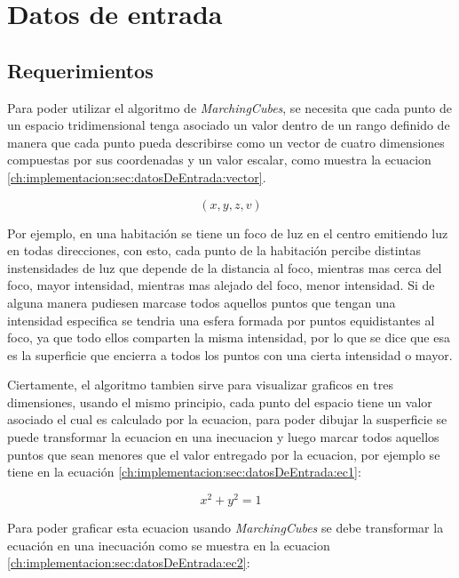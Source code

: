 \section{Datos de entrada}
\label{ch:implementacion:sec:datosDeEntrada}

\subsection{Requerimientos}
\label{ch:implementacion:sec:datosDeEntrada:subsec:requerimientos}

Para poder utilizar el algoritmo de \emph{MarchingCubes}, se necesita que cada punto de un espacio tridimensional tenga asociado un valor dentro de un rango definido de manera que cada punto pueda describirse como un vector de cuatro dimensiones compuestas por sus coordenadas y un valor escalar, como muestra la ecuacion \ref{ch:implementacion:sec:datosDeEntrada:vector}.

\begin{equation}
\label{ch:implementacion:sec:datosDeEntrada:vector}
	(x,y,z,v)
\end{equation}

Por ejemplo, en una habitación se tiene un foco de luz en el centro emitiendo luz en todas direcciones, con esto, cada punto de la habitación percibe distintas instensidades de luz que depende de la distancia al foco, mientras mas cerca del foco, mayor intensidad, mientras mas alejado del foco, menor intensidad. Si de alguna manera pudiesen marcase todos aquellos puntos que tengan una intensidad especifica se tendria una esfera formada por puntos equidistantes al foco, ya que todo ellos comparten la misma intensidad, por lo que se dice que esa es la superficie que encierra a todos los puntos con una cierta intensidad o mayor.

Ciertamente, el algoritmo tambien sirve para visualizar graficos en tres dimensiones, usando el mismo principio, cada punto del espacio tiene un valor asociado el cual es calculado por la ecuacion, para poder dibujar la susperficie se puede transformar la ecuacion en una inecuacion y luego marcar todos aquellos puntos que sean menores que el valor entregado por la ecuacion, por ejemplo se tiene en la ecuación \ref{ch:implementacion:sec:datosDeEntrada:ec1}:

\begin{equation}
\label{ch:implementacion:sec:datosDeEntrada:ec1}
	x^{2} + y^{2} = 1
\end{equation}

Para poder graficar esta ecuacion usando \emph{MarchingCubes} se debe transformar la ecuación en una inecuación como se muestra en la ecuacion \ref{ch:implementacion:sec:datosDeEntrada:ec2}:

